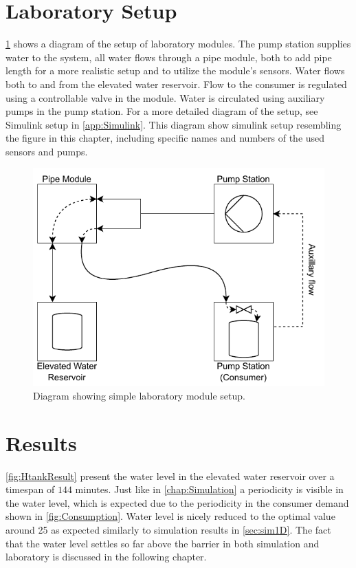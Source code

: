 \clearpage

\section{Laboratory Setup}
\cref{fig:LabSetup} shows a diagram of the setup of laboratory modules. The pump station supplies water to the system, all water flows through a pipe module, both to add pipe length for a more realistic setup and to utilize the module's sensors. Water flows both to and from the elevated water reservoir. Flow to the consumer is regulated using a controllable valve in the module. Water is circulated using auxiliary pumps in the pump station. For a more detailed diagram of the setup, see Simulink setup in \cref{app:Simulink}. This diagram show simulink setup resembling the figure in this chapter, including specific names and numbers of the used sensors and  pumps.

\begin{figure}[h!]
	\centering
	\includegraphics[width=0.7\linewidth]{Figures/LABsetupPDF.pdf}
	\caption{Diagram showing simple laboratory module setup.}
	\label{fig:LabSetup}
\end{figure}

\newpage

\section{Results}
\cref{fig:HtankResult} present the water level in the elevated water reservoir over a timespan of $ 144 $ minutes. Just like in \cref{chap:Simulation} a periodicity is visible in the water level, which is expected due to the periodicity in the consumer demand shown in \cref{fig:Consumption}. Water level is nicely reduced to the optimal value around 25 as expected similarly to simulation results in \cref{sec:sim1D}. The fact that the water level settles so far above the barrier in both simulation and laboratory is discussed in the following chapter. 

